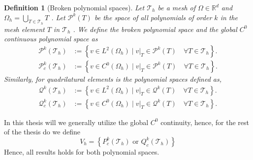 \documentclass[11pt]{article}
\newtheorem{definition}[theorem]{Definition}
\theoremstyle{remark}
\numberwithin{equation}{section}
\begin{document}
\begin{definition}[Broken polynomial spaces]
    Let $\mathcal{T}_{h} $ be a mesh of $\Omega \in \mathbb{R} ^{d} $ and $\Omega _{h} = \bigcup_{T \in \mathcal{T}_{h} } T$ . Let $\mathcal{P}^{k}(T) $ be the space of all polynomials of order $k$ in the mesh element $T$ in $\mathcal{T}_{h}$ . We define the broken polynomial space and the global $C^{0}$ continuous polynomial space as
    \begin{equation}
        \begin{split}
    \mathcal{P}^{k} ( \mathcal{T}_{h} ) & := \left\{ v \in L^{2}( \Omega _{h} )    \mid  v|_{T} \in \mathcal{P}^k( T) \quad  \forall T \in  \mathcal{T}_{h}   \right\}. \\
    \mathcal{P}^{k}_{c} ( \mathcal{T}_{h} ) & := \left\{ v \in C^{0}( \Omega _{h}  )   \mid  v|_{T} \in \mathcal{P}^k( T) \quad  \forall T \in  \mathcal{T}_{h}   \right\}.
        \end{split}
    \end{equation}
    Similarly, for quadrilatural elements is the polynomial spaces defined as,
    \begin{equation}
        \begin{split}
    \mathcal{Q}^{k} ( \mathcal{T}_{h} ) & := \left\{ v \in L^{2}( \Omega _{h} )    \mid  v|_{T} \in \mathcal{Q}^k( T) \quad  \forall T \in  \mathcal{T}_{h}   \right\}. \\
    \mathcal{Q}^{k}_{c} ( \mathcal{T}_{h} ) & := \left\{ v \in C^{0}( \Omega _{h} )   \mid  v|_{T} \in \mathcal{Q}^k( T) \quad  \forall T \in  \mathcal{T}_{h}   \right\}.
        \end{split}
    \end{equation}

\end{definition}


In this thesis will we generally utilize the global $C^{0}$ continuity, hence, for the rest of the thesis do we define
\begin{equation}
    \label{def:Vh_background}
V_{h} =  \left\{ P_{c}^{k}( \mathcal{T}_{h} ) \text{ or }  Q_{c}^{k}( \mathcal{T}_{h} )
 \right\} \end{equation}
Hence, all results holds for both polynomial spaces.
\end{document}

